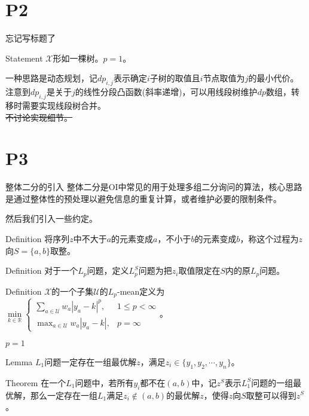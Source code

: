 \documentclass{beamer}
\begin{document}
\section{P2}
\begin{frame}{忘记写标题了}
\begin{block}{Statement}
	$\mathcal X$形如一棵树。$p = 1$。
\end{block}\pause

一种思路是动态规划，记$dp_{i, j}$表示确定$i$子树的取值且$i$节点取值为$j$的最小代价。\pause\\

注意到$dp_{i, j}$是关于$j$的线性分段凸函数(斜率递增)，可以用线段树维护$dp$数组，转移时需要实现线段树合并。\\

\sout{不讨论实现细节。}

\end{frame}

\section{P3}
\begin{frame}{整体二分的引入}
	整体二分是OI中常见的用于处理多组二分询问的算法，核心思路是通过整体性的预处理以避免信息的重复计算，或者维护必要的限制条件。\pause	

	然后我们引入一些约定。\pause
	\begin{block}{Definition}
	将序列$z$中不大于$a$的元素变成$a$，不小于$b$的元素变成$b$，称这个过程为$z$向$S = \{a, b\}$取整。
\end{block}
\pause
\begin{block}{Definition}
	对于一个$L_p$问题，定义$L_p^{S}$问题为把$z_i$取值限定在$S$内的原$L_p$问题。
\end{block}\pause
\begin{block}{Definition}
	$\mathcal X$的一个子集$\mathcal U$的$L_p$-mean定义为$\min\limits_{k \in \mathbb R}\begin{cases}
	\sum_{a \in \mathcal U} w_a|y_a - k|^p, & 1 \le p < \infty\\
	\max_{a \in \mathcal U} w_a|y_a - k|, & p = \infty
	\end{cases}$。
	
\end{block}

\end{frame}

\begin{frame}{$p = 1$}
	\begin{block}{Lemma}
		$L_1$问题一定存在一组最优解$z$，满足$z_i \in \{y_1, y_2, \cdots, y_n\}$。
	\end{block}
	\pause
	\begin{block}{Theorem}
	在一个$L_1$问题中，若所有$y_i$都不在$(a, b)$中，记$z^S$表示$L_1^S$问题的一组最优解，那么一定存在一组$L_1$满足$z_i \notin (a, b)$的最优解$z$，使得$z$向$S$取整可以得到$z^S$。
	\end{block}

\end{frame}
\end{document}
